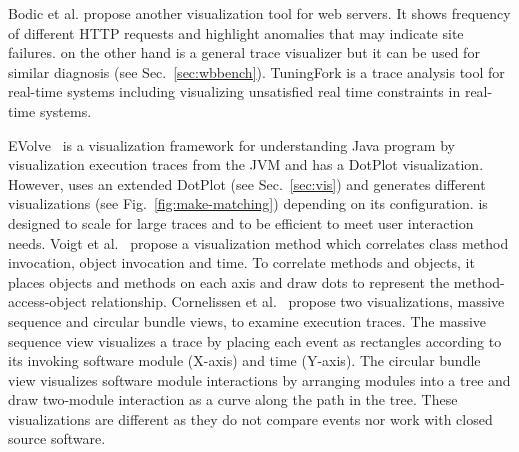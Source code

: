 Bodic et al. \cite{bodik05cvs} propose another visualization tool for
web servers.
It shows frequency of different HTTP requests
and highlight anomalies that may indicate site failures.
\VDP{} on the other hand is a general trace visualizer but
it can be used for similar diagnosis (see Sec.~\ref{sec:wbbench}).
TuningFork \cite{tuningfork} is a trace analysis tool for real-time systems
including visualizing unsatisfied real time constraints in
real-time systems.

EVolve~\cite{evolve} is a visualization framework for understanding
Java program by visualization execution traces from the JVM and
has a DotPlot visualization.
However, \VDP{} uses an extended DotPlot (see Sec.~\ref{sec:vis})
and generates different visualizations (see Fig.~\ref{fig:make-matching})
depending on its configuration.
\lviz{} is designed to scale for large traces and
to be efficient to meet user interaction needs.
Voigt et al.~\cite{voigt09oae} propose a visualization method which correlates
class method invocation, object invocation and time.
To correlate methods and objects, it places objects and methods
on each axis and draw dots to represent the
method-access-object relationship.
Cornelissen et al.~\cite{cornelissen} propose two visualizations,
massive sequence and circular bundle views, to examine execution traces.
The massive sequence view visualizes a trace by placing each event as rectangles
according to its invoking software module (X-axis) and time (Y-axis).
The circular bundle view visualizes software module interactions by arranging
modules into a tree and draw two-module interaction as a curve along the
path in the tree.
These visualizations are different as they do not compare events 
nor work with closed source software.

